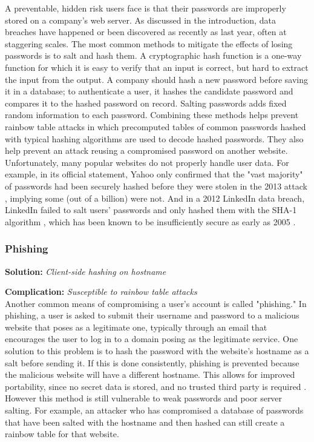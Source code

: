 \noindent A preventable, hidden risk users face is that their passwords are improperly stored on a company's web server. As discussed in the introduction, data breaches have happened or been discovered as recently as last year, often at staggering scales. The most common methods to mitigate the effects of losing passwords is to salt and hash them. A cryptographic hash function is a one-way function for which it is easy to verify that an input is correct, but hard to extract the input from the output. A company should hash a new password before saving it in a database; to authenticate a user, it hashes the candidate password and compares it to the hashed password on record. Salting passwords adds fixed random information to each password. Combining these methods helps prevent rainbow table attacks in which precomputed tables of common passwords hashed with typical hashing algorithms are used to decode hashed passwords. They also help prevent an attack reusing a compromised password on another website. Unfortunately, many popular websites do not properly handle user data. For example, in its official statement, Yahoo only confirmed that the "vast majority" of passwords had been securely hashed before they were stolen in the 2013 attack \cite{Lord:2016}, implying some (out of a billion) were not. And in a 2012 LinkedIn data breach, LinkedIn failed to salt users' passwords and only hashed them with the SHA-1 algorithm \cite{Perlroth:2012, Hackett:2016}, which has been known to be insufficiently secure as early as 2005 \cite{Wang:2005}.


\subsubsection{Phishing}

\textbf{Solution:} \emph{Client-side hashing on hostname}

\noindent\textbf{Complication:} \emph{Susceptible to rainbow table attacks}\\

\noindent Another common means of compromising a user's account is called "phishing." In phishing, a user is asked to submit their username and password to a malicious website that poses as a legitimate one, typically through an email that encourages the user to log in to a domain posing as the legitimate service. One solution to this problem is to hash the password with the website's hostname as a salt before sending it. If this is done consistently, phishing is prevented because the malicious website will have a different hostname. This allows for improved portability, since no secret data is stored, and no trusted third party is required \cite{Halderman:2005}. However this method is still vulnerable to weak passwords and poor server salting. For example, an attacker who has compromised a database of passwords that have been salted with the hostname and then hashed can still create a rainbow table for that website.


